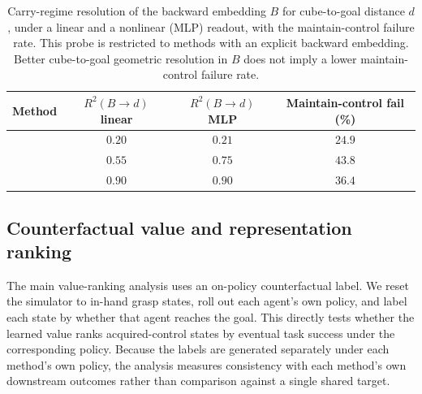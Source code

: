 \begin{table}[H]
\centering
\caption{Carry-regime resolution of the backward embedding $B$ for cube-to-goal distance $d$, under a linear and a nonlinear (MLP) readout, with the maintain-control failure rate. This probe is restricted to methods with an explicit backward embedding. Better cube-to-goal geometric resolution in $B$ does not imply a lower maintain-control failure rate.}
\label{tab:geometry_control}
\begin{tabular}{lccc}
\toprule
\textbf{Method} & \textbf{$R^2(B\to d)$ linear} & \textbf{$R^2(B\to d)$ MLP} & \textbf{Maintain-control fail (\%)} \\
\midrule
\fb{}   & $0.20$ & $0.21$          & $24.9$ \\
\rldp{} & $0.55$ & $0.75$          & $43.8$ \\
\psm{}  & $0.90$ & $\mathbf{0.90}$ & $36.4$ \\
\bottomrule
\end{tabular}
\end{table}

\subsection{Counterfactual value and representation ranking}
\label{app:counterfactual_ranking}

The main value-ranking analysis uses an on-policy counterfactual label.
We reset the simulator to in-hand grasp states, roll out each agent's own policy, and label each state by whether that agent reaches the goal.
This directly tests whether the learned value ranks acquired-control states by eventual task success under the corresponding policy.
Because the labels are generated separately under each method's own policy, the analysis measures consistency with each method's own downstream outcomes rather than comparison against a single shared target.


